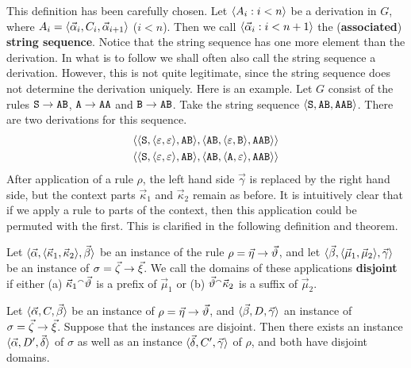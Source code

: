 This definition has been carefully chosen. Let $\langle A_i : i < n\rangle$
be a derivation in $G$, where $A_i = \langle \vec{\alpha}_i, C_i, 
\vec{\alpha}_{i+1}\rangle$ ($i < n$). Then we call
$\langle \vec{\alpha}_i : i < n+1\rangle$ the (\textbf{associated})
\textbf{string sequence}. Notice that the string sequence has one
more element than the derivation. In what is to follow we shall 
often also call the string sequence a derivation. However, this is not
quite legitimate, since the string sequence does not determine the
derivation uniquely. Here is an example. Let $G$ consist of the rules
$\mbox{\tt S} \rightarrow \mbox{\tt AB}$, $\mbox{\tt A} \rightarrow \mbox{\tt AA}$ 
and $\mbox{\tt B} \rightarrow \mbox{\tt AB}$.  Take the string sequence 
$\langle \mbox{\tt S}, \mbox{\tt AB}, \mbox{\tt AAB}\rangle$. There are 
two derivations for this sequence. 
\begin{subequations}
\begin{align}
& \langle\langle \mbox{\tt S}, \langle \varepsilon, \varepsilon\rangle,
    \mbox{\tt AB}\rangle, \langle \mbox{\tt AB},
    \langle \varepsilon, \mbox{\tt B}\rangle, \mbox{\tt AAB}\rangle\rangle \\
& \langle\langle \mbox{\tt S}, \langle \varepsilon, \varepsilon\rangle, 
	\mbox{\tt AB}\rangle, \langle \mbox{\tt AB}, \langle \mbox{\tt A}, 
	\varepsilon\rangle, \mbox{\tt AAB}\rangle\rangle
\end{align}
\end{subequations}
After application of a rule $\rho$, the left hand side $\vec{\gamma}$
is replaced by the right hand side, but the context parts $\vec{\kappa}_1$
and $\vec{\kappa}_2$ remain as before. It is intuitively clear that
if we apply a rule to parts of the context, then this application
could be permuted with the first. This is clarified in the following
definition and theorem.
\begin{defn}
Let $\langle \vec{\alpha}, \langle \vec{\kappa}_1, \vec{\kappa}_2\rangle,
\vec{\beta}\rangle$ be an instance of the rule 
$\rho = \vec{\eta} \rightarrow \vec{\vartheta}$, and let 
$\langle \vec{\beta}, \langle \vec{\mu}_1, \vec{\mu}_2\rangle, \vec{\gamma}\rangle$
be an instance of $\sigma = \vec{\zeta} \rightarrow \vec{\xi}$. We call the
domains of these applications \textbf{disjoint} if either
(a) $\vec{\kappa}_1{^{\smallfrown}}\vec{\vartheta}$ is a prefix
of $\vec{\mu}_1$ or (b) $\vec{\vartheta}{^{\smallfrown}} \vec{\kappa}_2$ is
a suffix of $\vec{\mu}_2$.
\end{defn}
\begin{lem}
\label{vertausch}
Let $\langle \vec{\alpha}, C, \vec{\beta}\rangle$ be an instance of 
$\rho = \vec{\eta} \rightarrow \vec{\vartheta}$, and 
$\langle \vec{\beta}, D, \vec{\gamma}\rangle$
an instance of $\sigma = \vec{\zeta} \rightarrow \vec{\xi}$. Suppose that the
instances are disjoint. Then there exists an instance
$\langle \vec{\alpha}, D', \vec{\delta}\rangle$ of $\sigma$ as well as an
instance $\langle \vec{\delta}, C', \vec{\gamma}\rangle$ of $\rho$,
and both have disjoint domains.
\end{lem}
